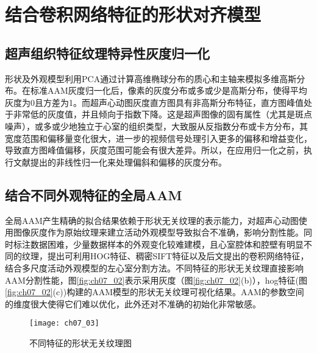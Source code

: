 \section{结合卷积网络特征的形状对齐模型} 

\subsection{超声组织特征纹理特异性灰度归一化} 
形状及外观模型利用PCA通过计算高维椭球分布的质心和主轴来模拟多维高斯分布。在标准AAM灰度归一化后，像素的灰度分布或多或少是高斯分布，使得平均灰度为0且方差为1。而超声心动图灰度直方图具有非高斯分布特征，直方图峰值处于非常低的灰度值，并且倾向于指数下降。这是超声图像的固有属性（尤其是斑点噪声），或多或少地独立于心室的组织类型，大致服从反指数分布或卡方分布\citep{Bosch2002}，其宽度范围和偏移量变化很大，进一步的视频信号处理引入更多的偏移和增益变化，导致直方图峰值偏移，灰度范围可能会有很大差异。所以，在应用归一化之前，执行文献提出的非线性归一化来处理偏斜和偏移的灰度分布。

\subsection{结合不同外观特征的全局AAM}
全局AAM产生精确的拟合结果依赖于形状无关纹理的表示能力，对超声心动图使用图像灰度作为原始纹理来建立活动外观模型导致拟合不准确，影响分割性能。同时标注数据困难，少量数据样本的外观变化较难建模，且心室腔体和腔壁有明显不同的纹理，提出可利用HOG特征、稠密SIFT特征以及后文提出的卷积网络特征，结合多尺度活动外观模型的左心室分割方法。不同特征的形状无关纹理直接影响AAM分割性能，图\ref{fig:ch07_02}表示采用灰度（图\ref{fig:ch07_02}(b)），hog特征(图\ref{fig:ch07_02}(c))构建的AAM模型的形状无关纹理可视化结果。AAM的参数空间的维度很大使得它们难以优化，此外还对不准确的初始化非常敏感。
\begin{figure}[!htbp]
\centering
\texttt{[image: ch07\_03]}
\caption{不同特征的形状无关纹理图}
\label{fig:ch07_03}
\end{figure} 
 
